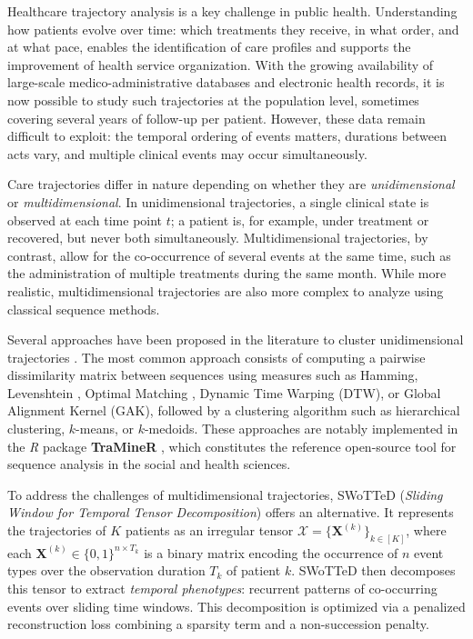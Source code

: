 \documentclass[pdflatex,sn-mathphys-num,referee,lineno]{sn-jnl}
\newcommand{\proglang}[1]{\textit{#1}}
\newcommand{\pkg}[1]{\textbf{#1}}
\begin{document}
Healthcare trajectory analysis is a key challenge in public health.
Understanding how patients evolve over time: which treatments they receive, in what order, and at what pace, enables the identification of care profiles and supports the improvement of health service organization.
With the growing availability of large-scale medico-administrative databases and electronic health records, it is now possible to study such trajectories at the population level, sometimes covering several years of follow-up per patient.
However, these data remain difficult to exploit: the temporal ordering of events matters, durations between acts vary, and multiple clinical events may occur simultaneously.

Care trajectories differ in nature depending on whether they are \emph{unidimensional} or \emph{multidimensional}.
In unidimensional trajectories, a single clinical state is observed at each time point $t$; a patient is, for example, under treatment or recovered, but never both simultaneously.
Multidimensional trajectories, by contrast, allow for the co-occurrence of several events at the same time, such as the administration of multiple treatments during the same month.
While more realistic, multidimensional trajectories are also more complex to analyze using classical sequence methods.

Several approaches have been proposed in the literature to cluster unidimensional trajectories \citep{denteuling2026clustering,pacca2025sequence}.
The most common approach consists of computing a pairwise dissimilarity matrix between sequences using measures such as Hamming, Levenshtein \citep{levenshtein1966binary}, Optimal Matching \citep{andjohn1986optimal}, Dynamic Time Warping (DTW), or Global Alignment Kernel (GAK), followed by a clustering algorithm such as hierarchical clustering, $k$-means, or $k$-medoids.
These approaches are notably implemented in the \proglang{R} package \pkg{TraMineR} \citep{traminer}, which constitutes the reference open-source tool for sequence analysis in the social and health sciences.

To address the challenges of multidimensional trajectories, SWoTTeD (\emph{Sliding Window for Temporal Tensor Decomposition}) \citep{sebia2024swotted} offers an alternative.
It represents the trajectories of $K$ patients as an irregular tensor $\mathcal{X} = \{\boldsymbol{X}^{(k)}\}_{k \in [K]}$, where each $\boldsymbol{X}^{(k)} \in \{0,1\}^{n \times T_k}$ is a binary matrix encoding the occurrence of $n$ event types over the observation duration $T_k$ of patient $k$.
SWoTTeD then decomposes this tensor to extract \emph{temporal phenotypes}: recurrent patterns of co-occurring events over sliding time windows.
This decomposition is optimized via a penalized reconstruction loss combining a sparsity term and a non-succession penalty.
\end{document}

